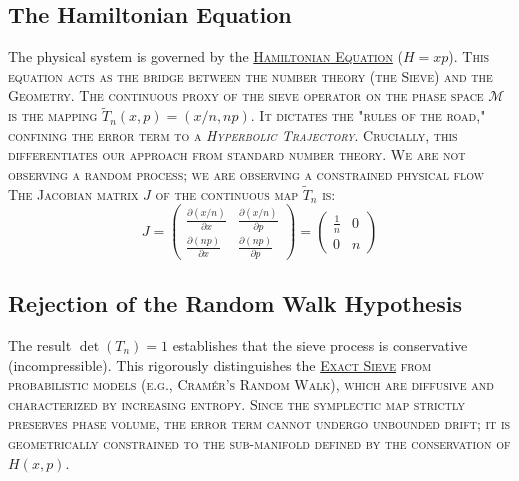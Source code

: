 \documentclass[sn-mathphys-num, pdflatex, referee]{sn-jnl}
\newcommand{\gterm}[2]{\begingroup\normalfont\scshape\hyperlink{#1}{#2}\endgroup}
\begin{document}
\subsection{The Hamiltonian Equation}
The physical system is governed by the \gterm{hamiltonian}{Hamiltonian Equation} ($H=xp$). This equation acts as the bridge between the number theory (the Sieve) and the Geometry. 
The continuous proxy of the sieve operator on the phase space $\mathcal{M}$ is the mapping $\tilde{T}_n(x,p) = (x/n, np)$. 
 It dictates the "rules of the road," confining the error term to a \textit{Hyperbolic Trajectory}. Crucially, this differentiates our approach from standard number theory. We are not observing a random process; we are observing a constrained physical flow 
The Jacobian matrix $J$ of the continuous map $\tilde{T}_n$ is:
\begin{equation}
J = \begin{pmatrix} \frac{\partial(x/n)}{\partial x} & \frac{\partial(x/n)}{\partial p} \\ \frac{\partial(np)}{\partial x} & \frac{\partial(np)}{\partial p} \end{pmatrix} = \begin{pmatrix} \frac{1}{n} & 0 \\ 0 & n \end{pmatrix}
\end{equation}

\subsection{Rejection of the Random Walk Hypothesis}
The result $\det(T_n) = 1$ establishes that the sieve process is conservative (incompressible). This rigorously distinguishes the \gterm{exact_sieve}{Exact Sieve} from probabilistic models (e.g., Cramér's Random Walk), which are diffusive and characterized by increasing entropy. Since the symplectic map strictly preserves phase volume, the error term cannot undergo unbounded drift; it is geometrically constrained to the sub-manifold defined by the conservation of $H(x,p)$.
\end{document}
